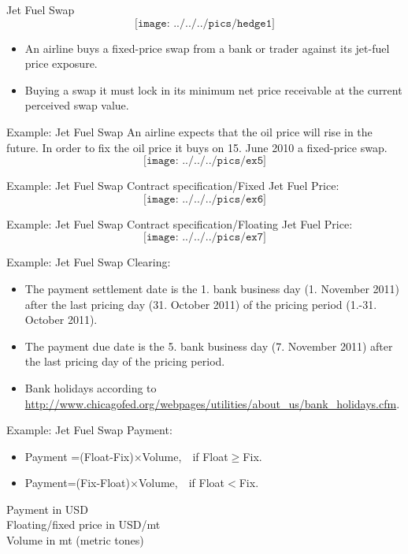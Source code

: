 {Jet Fuel Swap}
\vspace{-0.4cm}
$$\texttt{[image: ../../../pics/hedge1]}$$
\vspace{-0.7cm}
\begin{itemize}
  \item<1-> An airline buys a fixed-price swap from a bank or trader against its jet-fuel price exposure.
  \item<2-> Buying a swap it must lock in its minimum net price receivable at the current perceived swap value.
\end{itemize}



{Example: Jet Fuel Swap}
An airline expects that the oil price will rise in the future. In order to fix the oil price it buys on 15. June 2010 a \textcolor[rgb]{1.00,0.00,0.00}{fixed-price swap}. $$\texttt{[image: ../../../pics/ex5]}$$




{Example: Jet Fuel Swap}
Contract specification/Fixed Jet Fuel Price:\\
\vspace{0.2cm}
$$\texttt{[image: ../../../pics/ex6]}$$



{Example: Jet Fuel Swap}
Contract specification/Floating Jet Fuel Price:\\
\vspace{0.2cm}
$$\texttt{[image: ../../../pics/ex7]}$$



{Example: Jet Fuel Swap}
Clearing:
\begin{itemize}
  \item<1-> The payment settlement date is the 1. bank business day (1. November 2011) after the last pricing day (31. October 2011) of the pricing period (1.-31. October 2011).
  \item<2-> The payment due date is the 5. bank business day (7. November 2011) after the last pricing day of the pricing period.
  \item<3-> Bank holidays according to \url{http://www.chicagofed.org/webpages/utilities/about_us/bank_holidays.cfm}.
\end{itemize}



{Example: Jet Fuel Swap}
Payment:
\begin{itemize}
  \item Payment =(Float-Fix)$\times$Volume,$\quad$if Float$\geq$Fix.
  \item Payment=(Fix-Float)$\times$Volume,$\quad$if Float$<$Fix.
\end{itemize}
\vspace{0.3cm}
Payment in USD\\
Floating/fixed price in USD/mt\\
Volume in mt (metric tones)




